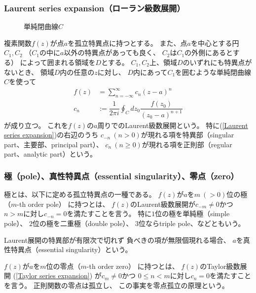 \subsubsection{Laurent series expansion（ローラン級数展開）}

\begin{wrapfigure}[7]{r}[5pt]{107pt}
  \centering
  
  \caption{単純閉曲線$C$}
\end{wrapfigure}
複素関数$f(z)$が点$a$を孤立特異点に持つとする。
また、点$a$を中心とする円$C_1, C_2$
（$C_1$の中に$a$以外の特異点があっても良く、
$C_2$は$C_1$の外側にあるとする）
によって囲まれる領域を$D$とする。
$C_1, C_2$上、領域$D$のいずれにも特異点がないとき、
領域$D$内の任意の$z$に対し、
$D$内にあって$C_1$を囲むような単純閉曲線$C$を使って
\begin{subequations}
\begin{align}
    f(z)
    &= \sum_{n=-\infty}^{\infty}
        c_n (z-a)^n
\label{Laurent series expansion}
\\
    c_n
    &:= \dfrac{1}{2 \pi i}
    \oint_C dz_0 \dfrac{f(z_0)}{(z_0 - a)^{n+1}}
\end{align}
\end{subequations}
が成り立つ。
これを$f(z)$の$a$周りでのLaurent級数展開という。
特に(\ref{Laurent series expansion})の右辺のうち
$c_{-n}\ (n > 0)$が現れる項を特異部（singular part、主要部、principal part）、
$c_{n}\ (n \ge 0)$が現れる項を正則部（regular part、analytic part）という。

\subsubsection{極（pole）、真性特異点（essential singularity）、零点（zero）}

極とは、以下に定める孤立特異点の一種である。
$f(z)$が$a$を$m\ (>0)$位の極（$m$-th order pole）
に持つとは、
$f(z)$のLaurent級数展開が$c_{-m} \neq 0$かつ
$n>m$に対し$c_{-n}=0$を満たすことを言う。
特に$1$位の極を単純極（simple pole）、
$2$位の極を二重極（double pole）、
$3$位ならtriple pole、などともいう。

Laurent展開の特異部が有限次で切れず
負べきの項が無限個現れる場合、
$a$を真性特異点（essential singularity）という。

$f(z)$が$a$を$m$位の零点（$m$-th order zero）
に持つとは、
$f(z)$のTaylor級数展開
(\ref{Taylor series expansion})
が$c_{m} \neq 0$かつ
$0 \le n < m$に対し$c_{n}=0$を満たすことを言う。
正則関数の零点は孤立し、
この事実を零点孤立の原理という。

